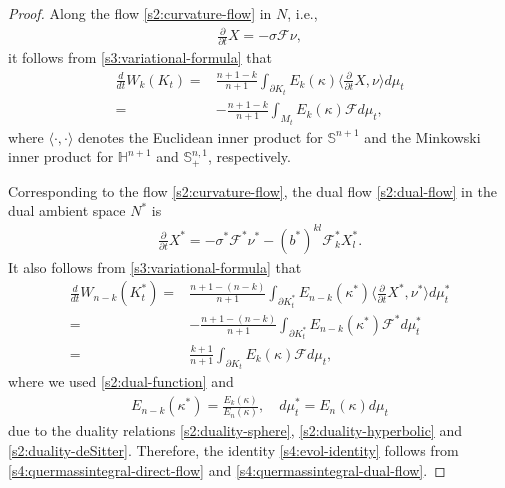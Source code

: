 \documentclass[10pt,a4paper]{amsart}
\newcommand{\s}{\sigma}
\renewcommand{\k}{\kappa}
\begin{document}
\begin{proof}
	Along the flow \eqref{s2:curvature-flow} in $N$, i.e.,
	\begin{align*}
	\frac{\partial}{\partial t}X=-\s \mathcal{F}\nu,
	\end{align*}
	it follows from \eqref{s3:variational-formula} that
	\begin{align}\label{s4:quermassintegral-direct-flow}
	\frac{d}{dt}W_k(K_t)=&\frac{n+1-k}{n+1}\int_{\partial K_t} E_k(\k) \langle \frac{\partial}{\partial t}X,\nu\rangle d\mu_t\nonumber \\ 
	=&-\frac{n+1-k}{n+1}\int_{M_t} E_k(\k) \mathcal{F} d\mu_t,
	\end{align}
	where $\langle \cdot,\cdot\rangle$ denotes the Euclidean inner product for $\mathbb S^{n+1}$ and the Minkowski inner product for $\mathbb H^{n+1}$ and $\mathbb S^{n,1}_{+}$, respectively.
	 
	Corresponding to the flow \eqref{s2:curvature-flow}, the dual flow \eqref{s2:dual-flow} in the dual ambient space $N^\ast$ is 
	\begin{align}
	\frac{\partial}{\partial t}X^\ast=-\s^\ast \mathcal{F}^\ast \nu^\ast-(b^\ast)^{kl}\mathcal{F}^\ast_k X^\ast_l.
	\end{align}
	It also follows from \eqref{s3:variational-formula} that
	\begin{align}\label{s4:quermassintegral-dual-flow}
	\frac{d}{dt}W_{n-k}(K^\ast_t)=&\frac{n+1-(n-k)}{n+1}\int_{\partial K^\ast_t} E_{n-k}(\k^\ast) \langle \frac{\partial}{\partial t}X^\ast, \nu^\ast \rangle d\mu^\ast_t \nonumber\\
	=&-\frac{n+1-(n-k)}{n+1}\int_{\partial K^\ast_t} E_{n-k}(\k^\ast) \mathcal{F}^\ast d\mu^\ast_t \nonumber\\
	=&\frac{k+1}{n+1}\int_{\partial K_t} E_k(\k) \mathcal{F} d\mu_t,
	\end{align}
	where we used \eqref{s2:dual-function} and 
	\begin{align*}
	E_{n-k}(\k^\ast)=\frac{E_k(\k)}{E_{n}(\k)}, \quad d\mu^\ast_t=E_n(\k) d\mu_t
	\end{align*}
	due to the duality relations \eqref{s2:duality-sphere}, \eqref{s2:duality-hyperbolic} and \eqref{s2:duality-deSitter}. Therefore, the identity \eqref{s4:evol-identity} follows from \eqref{s4:quermassintegral-direct-flow} and \eqref{s4:quermassintegral-dual-flow}.	
\end{proof}
\end{document}
